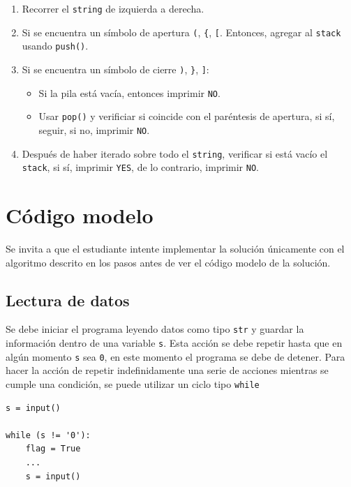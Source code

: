 \documentclass{article}
\begin{document}
\begin{enumerate} 
  \item Recorrer el \texttt{string} de izquierda a derecha.
  \item Si se encuentra un símbolo de apertura \texttt{(}, \texttt{\{}, \texttt{[}. Entonces, agregar al \texttt{stack} usando \texttt{push()}.
  \item Si se encuentra un símbolo de cierre \texttt{)}, \texttt{\}}, \texttt{]}:
        \begin{itemize}
          \item Si la pila está vacía, entonces imprimir \texttt{NO}.
          \item Usar \texttt{pop()} y verificiar si coincide con el paréntesis de apertura, si sí, seguir, si no, imprimir \texttt{NO}.
        \end{itemize}
  \item Después de haber iterado sobre todo el \texttt{string}, verificar si está vacío el \texttt{stack}, si sí, imprimir \texttt{YES}, de lo contrario, imprimir \texttt{NO}. 
\end{enumerate}

\section{Código modelo}
\label{sec:codigo}

Se invita a que el estudiante intente implementar la solución únicamente con el algoritmo descrito en los pasos antes de ver el código modelo de la solución.

\subsection{Lectura de datos}

Se debe iniciar el programa leyendo datos como tipo \lstinline[style=pythonstyle]{str} y guardar la información dentro de una variable \texttt{s}. Esta acción se debe repetir hasta que en algún momento \texttt{s} sea \texttt{0}, en este momento el programa se debe de detener. Para hacer la acción de repetir indefinidamente una serie de acciones mientras se cumple una condición, se puede utilizar un ciclo tipo \lstinline[style=pythonstyle]{while}

\begin{lstlisting}[style=pythonstyle]
s = input()

while (s != '0'):
    flag = True
    ...
    s = input()
\end{lstlisting}
\end{document}
